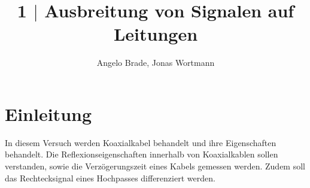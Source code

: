 \documentclass[a4paper,12pt,twocoloumn]{article}
\numberwithin{equation}{section}
\begin{document}

\title{1 $|$ Ausbreitung von Signalen auf Leitungen}
\author{Angelo Brade, Jonas Wortmann}
\maketitle
{}


\newpage


\fancyhead[L]{\thepage}
\fancyfoot[C]{}

\tableofcontents


\newpage


\fancyhead[R]{\leftmark\\\rightmark}

\section{Einleitung}
In diesem Versuch werden Koaxialkabel behandelt und ihre Eigenschaften behandelt.
Die Reflexionseigenschaften innerhalb von Koaxialkablen sollen verstanden, sowie die Verzögerungszeit eines Kabels gemessen werden.
Zudem soll das Rechtecksignal eines Hochpasses differenziert werden.

\newpage
\end{document}

